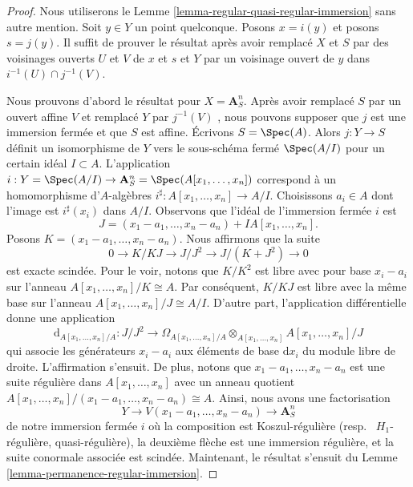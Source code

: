 \begin{proof}
Nous utiliserons le Lemme  \ref{lemma-regular-quasi-regular-immersion}  sans autre mention. Soit  $y \in Y$  un
point quelconque. Posons  $x = i(y)$  et posons  $s = j(y)$. Il suffit de prouver
le résultat après avoir remplacé  $X$  et  $S$  par des voisinages
ouverts  $U$  et  $V$  de  $x$  et  $s$  et
 $Y$  par un voisinage ouvert de  $y$  dans  $i^{-1}(U) \cap j^{-1}(V)$.

\medskip\noindent
Nous prouvons d'abord le résultat pour  $X = \mathbf{A}^n_S$. Après avoir remplacé
 $S$  par un ouvert affine  $V$  et remplacé  $Y$  par
 $j^{-1}(V)$ , nous pouvons supposer que  $j$  est une immersion fermée et
que  $S$  est affine. Écrivons  $S = \Spec(A)$. Alors  $j : Y \to S$  définit un
isomorphisme de  $Y$  vers le sous-schéma fermé  $\Spec(A/I)$  pour un
certain idéal  $I \subset A$. L'application  $i : Y = \Spec(A/I) \to
\mathbf{A}^n_S = \Spec(A[x_1, \ldots, x_n])$  correspond à un homomorphisme
d'$A$-algèbres  $i^\sharp : A[x_1, \ldots, x_n] \to A/I$. Choisissons  $a_i \in A$  dont l'image est
 $i^\sharp(x_i)$  dans  $A/I$. Observons que l'idéal de l'immersion fermée
 $i$  est
$$
J = (x_1 - a_1, \ldots, x_n - a_n) + IA[x_1, \ldots, x_n].
$$
Posons  $K = (x_1 - a_1, \ldots, x_n - a_n)$. Nous affirmons que la suite
$$
0 \to K/KJ \to J/J^2 \to J/(K + J^2) \to 0
$$
est exacte scindée. Pour le voir, notons que  $K/K^2$  est libre avec pour
base  $x_i - a_i$  sur l'anneau  $A[x_1, \ldots, x_n]/K \cong A$. Par conséquent,  $K/KJ$  est
libre avec la même base sur l'anneau  $A[x_1, \ldots, x_n]/J \cong A/I$. D'autre part, l'application différentielle donne une application
$$
\text{d}_{A[x_1, \ldots, x_n]/A} :
J/J^2
\longrightarrow
\Omega_{A[x_1, \ldots, x_n]/A} \otimes_{A[x_1, \ldots, x_n]}
A[x_1, \ldots, x_n]/J
$$
qui associe les générateurs  $x_i - a_i$  aux éléments de base  $\text{d}x_i$  du
module libre de droite. L'affirmation s'ensuit. De plus, notons que
 $x_1 - a_1, \ldots, x_n - a_n$  est une suite régulière dans  $A[x_1, \ldots, x_n]$  avec un anneau quotient
 $A[x_1, \ldots, x_n]/(x_1 - a_1, \ldots, x_n - a_n) \cong A$. Ainsi, nous avons une factorisation
$$
Y \to V(x_1 - a_1, \ldots, x_n - a_n) \to \mathbf{A}^n_S
$$
de notre immersion fermée  $i$  où la composition est Koszul-régulière
(resp. \ $H_1$-régulière, quasi-régulière), la deuxième flèche
est une immersion régulière, et la suite conormale associée est scindée.
Maintenant, le résultat s'ensuit du Lemme  \ref{lemma-permanence-regular-immersion}.


\end{proof}
